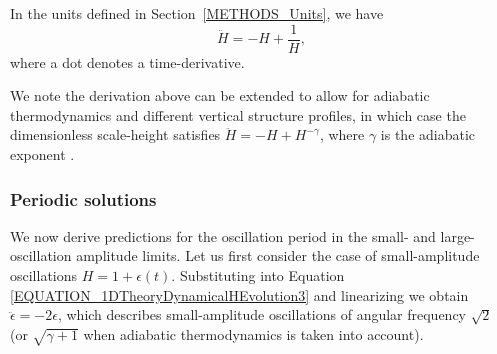\documentclass[fleqn,usenatbib]{mnras}
\begin{document}
In the units defined in Section~\ref{METHODS_Units}, we have
\begin{equation}
    \ddot H = -H + \frac{1}{H},
    \label{EQUATION_1DTheoryDynamicalHEvolution3}
\end{equation}
where a dot denotes a time-derivative.

We note the derivation above can be extended to allow for adiabatic thermodynamics and different vertical structure profiles, in which case the dimensionless scale-height satisfies
$\ddot H = -H + H^{-\gamma}$, where $\gamma$ is the adiabatic exponent \citep[cf.][]{ogilvie2014local}.

\subsubsection{Periodic solutions}
We now derive predictions for the oscillation period in the small- and large-oscillation amplitude limits. Let us first consider the case of small-amplitude oscillations $H=1+\epsilon(t)$. Substituting into Equation \ref{EQUATION_1DTheoryDynamicalHEvolution3} and linearizing we obtain $\ddot\epsilon=-2\epsilon$,
which describes small-amplitude oscillations of angular frequency $\sqrt{2}$ (or $\sqrt{\gamma+1}$ when adiabatic thermodynamics is taken into account).
\end{document}
